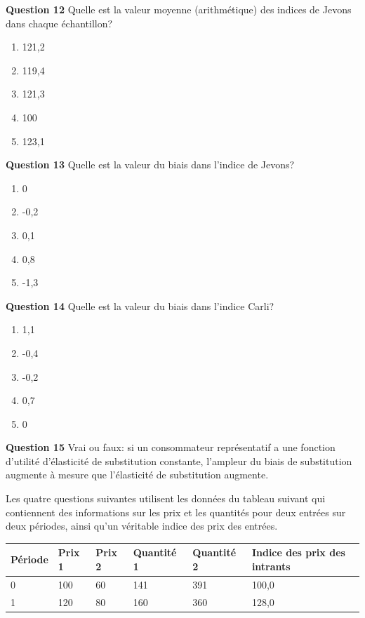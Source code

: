 \documentclass[]{article}
\begin{document}
\textbf{Question 12} Quelle est la valeur moyenne (arithmétique) des indices de Jevons dans chaque échantillon?

\begin{enumerate}
\def\labelenumi{\alph{enumi})}
\item
  121,2
\item
  119,4
\item
  121,3
\item
  100
\item
  123,1
\end{enumerate}

\textbf{Question 13} Quelle est la valeur du biais dans l'indice de Jevons?

\begin{enumerate}
\def\labelenumi{\alph{enumi})}
\item
  0
\item
  -0,2
\item
  0,1
\item
  0,8
\item
  -1,3
\end{enumerate}

\textbf{Question 14} Quelle est la valeur du biais dans l'indice Carli?

\begin{enumerate}
\def\labelenumi{\alph{enumi})}
\item
  1,1
\item
  -0,4
\item
  -0,2
\item
  0,7
\item
  0
\end{enumerate}

\textbf{Question 15} Vrai ou faux: si un consommateur représentatif a une fonction d'utilité d'élasticité de substitution constante, l'ampleur du biais de substitution augmente à mesure que l'élasticité de substitution augmente.

Les quatre questions suivantes utilisent les données du tableau suivant qui contiennent des informations sur les prix et les quantités pour deux entrées sur deux périodes, ainsi qu'un véritable indice des prix des entrées.

\begin{longtable}[]{@{}llllll@{}}
\toprule
Période & Prix 1 & Prix 2 & Quantité 1 & Quantité 2 & Indice des prix des intrants\tabularnewline
\midrule
\endhead
0 & 100 & 60 & 141 & 391 & 100,0\tabularnewline
1 & 120 & 80 & 160 & 360 & 128,0\tabularnewline
\bottomrule
\end{longtable}
\end{document}
